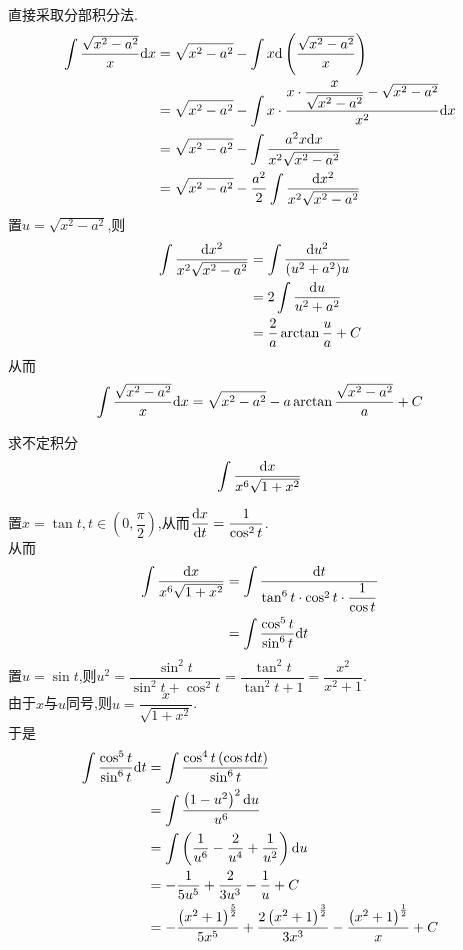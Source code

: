 \documentclass{ctexart}
\begin{document}
\begin{solution}
    直接采取分部积分法.
    $$\begin{aligned}
        \int{\dfrac{\sqrt{x^2-a^2}}{x}\mathrm{d}x}
        &= \sqrt{x^2-a^2}-\int x\mathrm{d}\left(\dfrac{\sqrt{x^2-a^2}}{x}\right) \\
        &= \sqrt{x^2-a^2}-\int x\cdot\dfrac{x\cdot\dfrac{x}{\sqrt{x^2-a^2}}-\sqrt{x^2-a^2}}{x^2}\mathrm{d} x \\
        &= \sqrt{x^2-a^2}-\int\dfrac{a^2x\mathrm{d} x}{x^2\sqrt{x^2-a^2}} \\
        &= \sqrt{x^2-a^2}-\dfrac{a^2}{2}\int\dfrac{\mathrm{d} x^2}{x^2\sqrt{x^2-a^2}}
    \end{aligned}$$
    置$u=\sqrt{x^2-a^2}$,则
    $$\begin{aligned}
        \int\dfrac{\mathrm{d} x^2}{x^2\sqrt{x^2-a^2}}
        &= \int\dfrac{\mathrm{d} u^2}{(u^2+a^2)u} \\
        &= 2\int{\dfrac{\mathrm{d}u}{u^2+a^2}} \\
        &= \dfrac{2}{a}\arctan{\dfrac{u}{a}}+C
    \end{aligned}$$
    从而$$\int{\dfrac{\sqrt{x^2-a^2}}{x}\mathrm{d}x}=\sqrt{x^2-a^2}-a\arctan\dfrac{\sqrt{x^2-a^2}}{a}+C$$
\end{solution}
\begin{problem}[Problem 2.]
    求不定积分$$\int{\dfrac{\mathrm{d}x}{x^6\sqrt{1+x^2}}}$$
\end{problem}
\begin{solution}[Solution.]
    置$x=\tan t,t\in\left(0,\dfrac{\pi}{2}\right)$,从而$\dfrac{\mathrm{d} x}{\mathrm{d} t}=\dfrac{1}{\cos^2t}$.\\
    从而
    $$\begin{aligned}
        \int{\dfrac{\mathrm{d}x}{x^6\sqrt{1+x^2}}}
        &= \int{\dfrac{\mathrm{d}t}{\tan^6t\cdot\cos^2t\cdot\dfrac{1}{\cos t}}} \\
        &= \int{\dfrac{\cos^5t}{\sin^6t}\mathrm{d}t}
    \end{aligned}$$
    置$u=\sin t$,则$u^2=\dfrac{\sin^2t}{\sin^2t+\cos^2t}=\dfrac{\tan^2t}{\tan^2t+1}=\dfrac{x^2}{x^2+1}$.\\
    由于$x$与$u$同号,则$u=\dfrac{x}{\sqrt{1+x^2}}$.\\
    于是
    $$\begin{aligned}
        \int{\dfrac{\cos^5t}{\sin^6t}\mathrm{d}t}
        &= \int{\dfrac{\cos^4t\left(\cos t\mathrm{d}t\right)}{\sin^6t}} \\
        &= \int{\dfrac{\left(1-u^2\right)^2\mathrm{d}u}{u^6}} \\
        &= \int{\left(\dfrac{1}{u^6}-\dfrac{2}{u^4}+\dfrac{1}{u^2}\right)\mathrm{d}u} \\
        &= -\dfrac{1}{5u^5}+\dfrac{2}{3u^3}-\dfrac{1}{u}+C \\
        &= -\dfrac{\left(x^2+1\right)^\frac{5}{2}}{5x^5}+\dfrac{2\left(x^2+1\right)^\frac{3}{2}}{3x^3}-\dfrac{\left(x^2+1\right)^\frac{1}{2}}{x}+C
    \end{aligned}$$
\end{solution}
\end{document}
